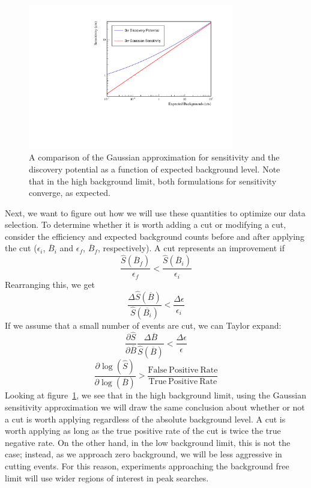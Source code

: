 \documentclass[/main.tex]{subfiles}
\begin{document}
\begin{figure}[h]
  \centering
  \includegraphics[width=0.8\textwidth]{DPvSens}
  \caption[Comparison between sensitivity in Gaussian background approximation and Discovery Potential] {\label{fig:DPvSens}
    A comparison of the Gaussian approximation for sensitivity and the discovery potential as a function of expected background level. Note that in the high background limit, both formulations for sensitivity converge, as expected.
    }
\end{figure}
Next, we want to figure out how we will use these quantities to optimize our data selection.
To determine whether it is worth adding a cut or modifying a cut, consider the efficiency and expected background counts before and after applying the cut ($\epsilon_i$, $\overline{B}_i$ and $\epsilon_f$, $\overline{B}_f$, respectively).
A cut represents an improvement if
\begin{equation}
  \frac{\hat{S}(\overline{B}_f)}{\epsilon_f} <\frac{\hat{S}(\overline{B}_i)}{\epsilon_i}
\end{equation}
Rearranging this, we get
\begin{equation}
  \frac{\Delta \hat{S}(\overline{B})}{\hat{S}(\overline{B_i})} < \frac{\Delta\epsilon}{\epsilon_i}
\end{equation}
If we assume that a small number of events are cut, we can Taylor expand:
\begin{equation} \label{eq:cutcriterion}
  \frac{\partial\hat{S}}{\partial\overline{B}} \frac{\Delta\overline{B}}{\hat{S}(\overline{B})} < \frac{\Delta\epsilon}{\epsilon}
\end{equation}
\begin{equation}
  \frac{\partial\log(\hat{S})}{\partial\log(\overline{B})} > \frac{\mathrm{False~Positive~Rate}}{\mathrm{True~Positive~Rate}}
\end{equation}
Looking at figure~\ref{fig:DPvSens}, we see that in the high background limit, using the Gaussian sensitivity approximation we will draw the same conclusion about whether or not a cut is worth applying regardless of the absolute background level.
A cut is worth applying as long as the true positive rate of the cut is twice the true negative rate.
On the other hand, in the low background limit, this is not the case; instead, as we approach zero background, we will be less aggressive in cutting events.
For this reason, experiments approaching the background free limit will use wider regions of interest in peak searches.

\onlyinsubfile{
  
  
}
\end{document}
